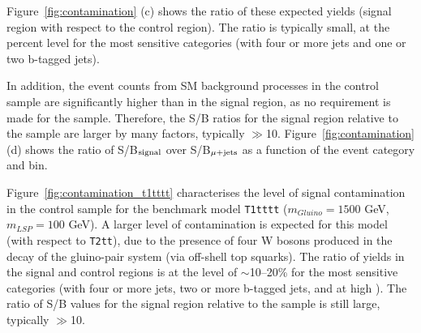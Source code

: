 Figure~\ref{fig:contamination} (c) shows the ratio of these expected
yields (signal region with respect to the \mj control region). The
ratio is typically small, at the percent level for the most sensitive
categories (\ie with four or more jets and one or two b-tagged jets).

In addition, the event counts from SM background processes in the \mj
control sample are significantly higher than in the signal region, as
no \alphat requirement is made for the \mj sample. Therefore, the S/B
ratios for the signal region relative to the \mj sample are larger by
many factors, typically $\gg$10. Figure~\ref{fig:contamination} (d)
shows the ratio of S/B$_{\rm signal}$ over S/B$_{\rm \mj}$ as a
function of the event category and \scalht bin.

Figure~\ref{fig:contamination_t1tttt} characterises the level of
signal contamination in the \mj control sample for the benchmark model
\texttt{T1tttt} ($m_{Gluino}=1500$ GeV, $m_{LSP}=100$ GeV). A larger level of contamination is
expected for this model (with respect to \texttt{T2tt}), due to the
presence of four W bosons produced in the decay of the gluino-pair
system (via off-shell top squarks). The ratio of yields in the signal
and \mj control regions is at the level of $\sim$10--20\% for the most
sensitive categories (\ie with four or more jets, two or more b-tagged
jets, and at high \scalht). The ratio of S/B values for the signal
region relative to the \mj sample is still large, typically $\gg$10.

